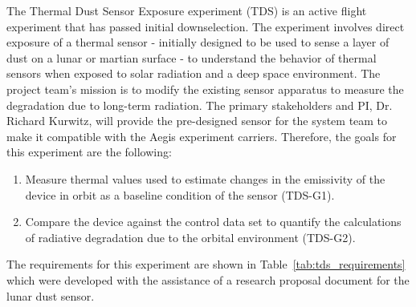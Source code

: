 \documentclass[conf]{new-aiaa}
\begin{document}
The Thermal Dust Sensor Exposure experiment (TDS) is an active flight experiment that has passed initial downselection. The experiment involves direct exposure of a thermal sensor - initially designed to be used to sense a layer of dust on a lunar or martian surface - to understand the behavior of thermal sensors when exposed to solar radiation and a deep space environment. The project team's mission is to modify the existing sensor apparatus to measure the degradation due to long-term radiation. The primary stakeholders and PI, Dr. Richard Kurwitz, will provide the pre-designed sensor for the system team to make it compatible with the Aegis experiment carriers. Therefore, the goals for this experiment are the following: \cite{kurwitz-lsep-2026}

\vspace{0.3em}
\begin{enumerate}[leftmargin=*]
    \item Measure thermal values used to estimate changes in the emissivity of the device in orbit as a baseline condition of the sensor (TDS-G1).
    \item Compare the device against the control data set to quantify the calculations of radiative degradation due to the orbital environment (TDS-G2).
\end{enumerate}

The requirements for this experiment are shown in Table~\ref{tab:tds_requirements} which were developed with the assistance of a research proposal document for the lunar dust sensor. \cite{kurwitz-lsep-2026}
\end{document}
